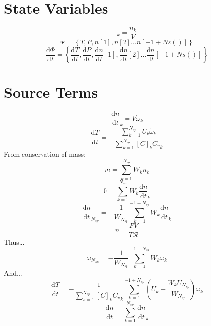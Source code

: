 \documentclass[a4paper,10pt]{article}
\newcommand{\ns}{N_{sp}}
\newcommand{\Ru}{\mathcal{R}}
\begin{document}
\section{State Variables}
\begin{dmath} [C]_{k} = \frac{n_{k}}{V}\end{dmath} 
\begin{dmath} \Phi = \left\{T,P,n[1],n[2]\ldots n[-1 + Ns()]\right\}\end{dmath} 
\begin{dmath} \frac{\text{d} \Phi }{\text{d} t } = \left\{\frac{\text{d} T }{\text{d} t },\frac{\text{d} P }{\text{d} t },\frac{\text{d} n }{\text{d} t }[1],\frac{\text{d} n }{\text{d} t }[2]\ldots \frac{\text{d} n }{\text{d} t }[-1 + Ns()]\right\}\end{dmath} 
\section{Source Terms}
\begin{dmath} \frac{\text{d} n }{\text{d} t }_{k} = V \dot{\omega}_{k}\end{dmath} 
\begin{dmath} \frac{\text{d} T }{\text{d} t } = - \frac{\sum_{k=1}^{\ns} U_{k} \dot{\omega}_{k}}{\sum_{k=1}^{\ns} [C]_{k} {C_v}_{k}}\end{dmath} 
From conservation of mass:
\begin{dmath} m = \sum_{k=1}^{\ns} W_{k} n_{k}\end{dmath} 
\begin{dmath} 0 = \sum_{k=1}^{\ns} W_{k} \frac{\text{d} n }{\text{d} t }_{k}\end{dmath} 
\begin{dmath} \frac{\text{d} n }{\text{d} t }_{\ns} = - \frac{1}{W_{\ns}} \sum_{k=1}^{-1 + \ns} W_{k} \frac{\text{d} n }{\text{d} t }_{k}\end{dmath} 
\begin{dmath} n = \frac{P V}{T \Ru}\end{dmath} 
Thus...\begin{dmath} \dot{\omega}_{\ns} = - \frac{1}{W_{\ns}} \sum_{k=1}^{-1 + \ns} W_{k} \dot{\omega}_{k}\end{dmath} 
And...\begin{dmath} \frac{\text{d} T }{\text{d} t } = - \frac{1}{\sum_{k=1}^{\ns} [C]_{k} {C_v}_{k}} \sum_{k=1}^{-1 + \ns} \left(U_{k} - \frac{W_{k} U_{\ns}}{W_{\ns}}\right) \dot{\omega}_{k}\end{dmath} 
\begin{dmath} \frac{\text{d} n }{\text{d} t } = \sum_{k=1}^{\ns} \frac{\text{d} n }{\text{d} t }_{k}\end{dmath} 
\end{document}
